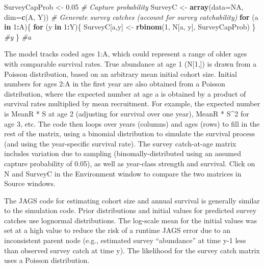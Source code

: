 \documentclass[
]{krantz}
\makeatletter
\newenvironment{Shaded}{\begin{snugshade}}{\end{snugshade}}
\newcommand{\AttributeTok}[1]{\textcolor[rgb]{0.27,0.27,0.27}{#1}}
\newcommand{\CommentTok}[1]{\textcolor[rgb]{0.37,0.37,0.37}{\textit{#1}}}
\newcommand{\ConstantTok}[1]{\textcolor[rgb]{0.37,0.37,0.37}{#1}}
\newcommand{\ControlFlowTok}[1]{\textcolor[rgb]{0.27,0.27,0.27}{\textbf{#1}}}
\newcommand{\DecValTok}[1]{\textcolor[rgb]{0.06,0.06,0.06}{#1}}
\newcommand{\FloatTok}[1]{\textcolor[rgb]{0.06,0.06,0.06}{#1}}
\newcommand{\FunctionTok}[1]{\textcolor[rgb]{0.27,0.27,0.27}{\textbf{#1}}}
\newcommand{\NormalTok}[1]{#1}
\newcommand{\OtherTok}[1]{\textcolor[rgb]{0.37,0.37,0.37}{#1}}
\newcommand{\SpecialCharTok}[1]{\textcolor[rgb]{0.43,0.43,0.43}{\textbf{#1}}}
\newenvironment{kframe}{%
\medskip{}
\setlength{\fboxsep}{.8em}
 \def\at@end@of@kframe{}%
 \ifinner\ifhmode%
  \def\at@end@of@kframe{\end{minipage}}%
  \begin{minipage}{\columnwidth}%
 \fi\fi%
 \def\FrameCommand##1{\hskip\@totalleftmargin \hskip-\fboxsep
 \colorbox{shadecolor}{##1}\hskip-\fboxsep
     \hskip-\linewidth \hskip-\@totalleftmargin \hskip\columnwidth}%
 \MakeFramed {\advance\hsize-\width
   \@totalleftmargin\z@ \linewidth\hsize
   \@setminipage}}%
 {\par\unskip\endMakeFramed%
 \at@end@of@kframe}
\renewenvironment{Shaded}{\begin{kframe}}{\end{kframe}}
\makeatother
\begin{document}
\begin{Shaded}
\begin{Highlighting}[]
\NormalTok{SurveyCapProb }\OtherTok{\textless{}{-}} \FloatTok{0.05} \CommentTok{\# Capture probability}
\NormalTok{SurveyC }\OtherTok{\textless{}{-}} \FunctionTok{array}\NormalTok{(}\AttributeTok{data=}\ConstantTok{NA}\NormalTok{, }\AttributeTok{dim=}\FunctionTok{c}\NormalTok{(A, Y))}
\CommentTok{\# Generate survey catches (account for survey catchability)}
\ControlFlowTok{for}\NormalTok{ (a }\ControlFlowTok{in} \DecValTok{1}\SpecialCharTok{:}\NormalTok{A)\{}
  \ControlFlowTok{for}\NormalTok{ (y }\ControlFlowTok{in} \DecValTok{1}\SpecialCharTok{:}\NormalTok{Y)\{}
\NormalTok{    SurveyC[a,y] }\OtherTok{\textless{}{-}} \FunctionTok{rbinom}\NormalTok{(}\DecValTok{1}\NormalTok{, N[a, y], SurveyCapProb)}
\NormalTok{  \} }\CommentTok{\#y}
\NormalTok{\} }\CommentTok{\#a}
\end{Highlighting}
\end{Shaded}

The model tracks coded ages 1:A, which could represent a range of older ages with comparable survival rates. True abundance at age 1 (N{[}1,{]}) is drawn from a Poisson distribution, based on an arbitrary mean initial cohort size. Initial numbers for ages 2:A in the first year are also obtained from a Poisson distribution, where the expected number at age a is obtained by a product of survival rates multiplied by mean recruitment. For example, the expected number is MeanR * S at age 2 (adjusting for survival over one year), MeanR * S\^{}2 for age 3, etc. The code then loops over years (columns) and ages (rows) to fill in the rest of the matrix, using a binomial distribution to simulate the survival process (and using the year-specific survival rate). The survey catch-at-age matrix includes variation due to sampling (binomally-distributed using an assumed capture probability of 0.05), as well as year-class strength and survival. Click on N and SurveyC in the Environment window to compare the two matrices in Source windows.

The JAGS code for estimating cohort size and annual survival is generally similar to the simulation code. Prior distributions and initial values for predicted survey catches use lognormal distributions. The log-scale mean for the initial values was set at a high value to reduce the risk of a runtime JAGS error due to an inconsistent parent node (e.g., estimated survey ``abundance'' at time y-1 less than observed survey catch at time y). The likelihood for the survey catch matrix uses a Poisson distribution.
\end{document}
